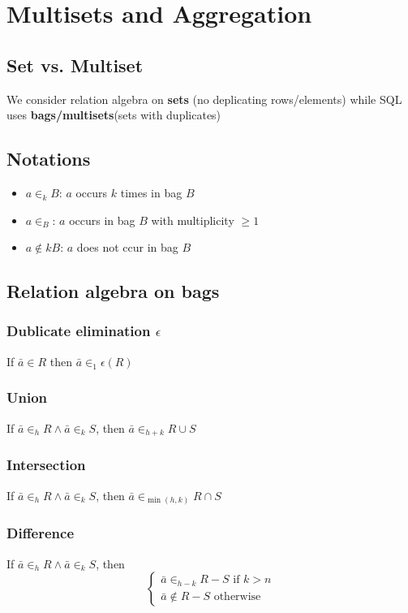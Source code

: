 \documentclass{article}
\begin{document}
\section{Multisets and Aggregation}
\subsection{Set vs. Multiset}
We consider relation algebra on \textbf{sets} (no deplicating rows/elements) while SQL uses \textbf{bags/multisets}(sets with duplicates)

\subsection{Notations}
\begin{itemize}
  \item $a \in_k B$: $a$ occurs $k$ times in bag $B$
  \item $a \in_ B$: $a$ occurs in bag $B$ with multiplicity $\geq 1$
  \item $a \notin k B$: $a$ does not ccur in bag $B$
\end{itemize}

\subsection{Relation algebra on bags}
\subsubsection*{Dublicate elimination $\epsilon$}
If $\bar{a} \in R$ then $\bar{a}\in_1\epsilon(R)$
\subsubsection*{Union}
If $\bar{a} \in_h R \wedge \bar{a}\in_k S$, then $\bar{a} \in_{h+k} R\cup S$
\subsubsection*{Intersection}
If $\bar{a} \in_h R \wedge \bar{a}\in_k S$, then $\bar{a} \in_{\min(h,k)} R\cap S$
\subsubsection*{Difference}
If $\bar{a} \in_h R \wedge \bar{a}\in_k S$, then
$$\begin{cases}
    \bar{a} \in_{h-k} R-S \text{ if } k > n \\
    \bar{a} \notin R-S\text{ otherwise}
  \end{cases}$$
\end{document}

